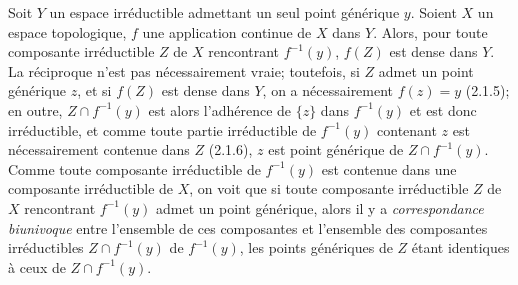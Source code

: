 \begin{env}[2.1.8]
\label{0.2.1.8-fr}
Soit $Y$ un espace irréductible admettant un seul point générique $y$. Soient
$X$ un espace topologique, $f$ une application continue de $X$ dans $Y$.
Alors, pour toute composante irréductible $Z$ de $X$ rencontrant $f^{-1}(y)$,
$f(Z)$ est dense dans $Y$. La réciproque n'est pas nécessairement vraie;
toutefois, si $Z$ admet un point générique $z$, et si $f(Z)$ est dense dans
$Y$, on a nécessairement $f(z)=y$ (2.1.5); en outre, $Z\cap f^{-1}(y)$ est
alors l'adhérence de $\{z\}$ dans $f^{-1}(y)$ et est donc irréductible, et
comme toute partie irréductible de $f^{-1}(y)$ contenant $z$ est
nécessairement contenue dans $Z$ (2.1.6), $z$ est point générique de
$Z\cap f^{-1}(y)$. Comme toute composante irréductible de $f^{-1}(y)$ est
contenue dans une composante irréductible de $X$, on voit que si toute
composante irréductible $Z$ de $X$ rencontrant $f^{-1}(y)$ admet un point
générique, alors il y a \emph{correspondance biunivoque} entre l'ensemble de
ces composantes et l'ensemble des composantes irréductibles
$Z\cap f^{-1}(y)$ de $f^{-1}(y)$, les points génériques de $Z$ étant
identiques à ceux de $Z\cap f^{-1}(y)$.
\end{env}

